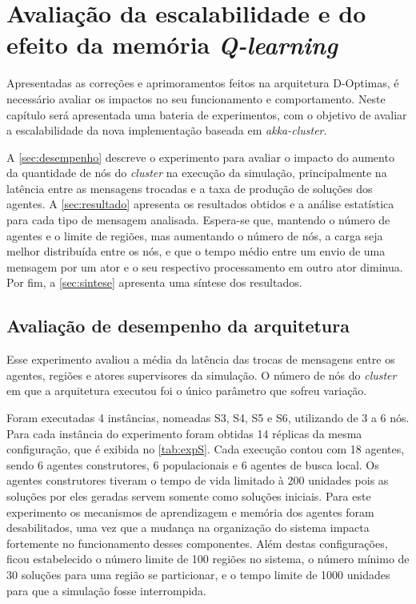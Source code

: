 

\chapter{Avaliação da escalabilidade e do efeito da memória \textit{Q-learning}}
\label{chap:exp_preliminares}

Apresentadas as correções e aprimoramentos feitos na arquitetura D-Optimas, é necessário avaliar os impactos no seu funcionamento e comportamento. Neste capítulo será apresentada uma  bateria de experimentos, com o objetivo de avaliar a escalabilidade da nova implementação baseada em \textit{akka-cluster}.

A \autoref{sec:desempenho} descreve o experimento para avaliar o impacto do aumento da quantidade de nós do \textit{cluster} na execução da simulação, principalmente na latência entre as mensagens trocadas e a taxa de produção de soluções dos agentes. A \autoref{sec:resultado} apresenta os resultados obtidos e a análise estatística para cada tipo de mensagem analisada. Espera-se que, mantendo o número de agentes e o limite de regiões, mas aumentando o número de nós, a carga seja melhor distribuída entre os nós, e que o tempo médio entre um envio de uma mensagem por um ator e o seu respectivo processamento em outro ator diminua. Por fim, a \autoref{sec:sintese} apresenta uma síntese dos resultados. 

\section{Avaliação de desempenho da arquitetura}
\label{sec:desempenho}

Esse experimento avaliou a média da latência das trocas de mensagens entre os agentes, regiões e atores supervisores da simulação. O número de nós do \textit{cluster} em que a arquitetura executou foi o único parâmetro que sofreu variação. 

Foram executadas 4 instâncias, nomeadas S3, S4, S5 e S6, utilizando de 3 a 6 nós. Para cada instância do experimento foram obtidas 14 réplicas da mesma configuração, que é exibida no \autoref{tab:expS}. Cada execução contou com 18 agentes, sendo 6 agentes construtores, 6 populacionais e 6 agentes de busca local. Os agentes construtores tiveram o tempo de vida limitado à 200 unidades pois as soluções por eles geradas servem somente como soluções iniciais.
Para este experimento os mecanismos de aprendizagem e memória dos agentes foram desabilitados, uma vez que a mudança na organização do sistema impacta fortemente no funcionamento desses componentes. 
Além destas configurações, ficou estabelecido o número limite de 100 regiões no sistema, o número mínimo de 30 soluções para uma região se particionar, e o tempo limite de 1000 unidades para que a simulação fosse interrompida.

